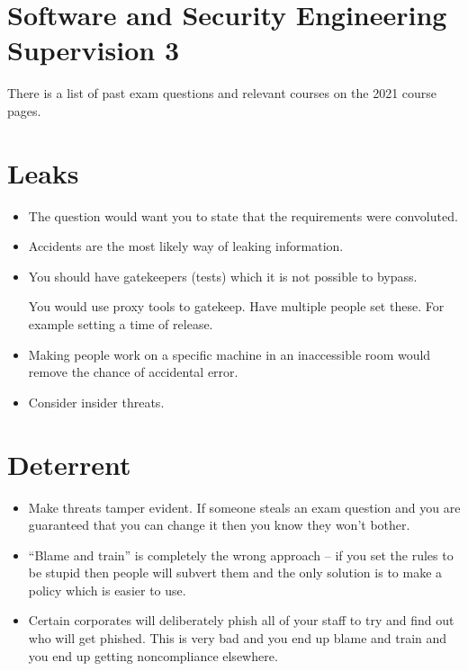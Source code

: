 \documentclass[10pt, a4paper]{article}
\begin{document}
\section*{Software and Security Engineering Supervision 3}

There is a list of past exam questions and relevant courses on the 2021 course pages.

\section{Leaks}

\begin{itemize}

\item The question would want you to state that the requirements were convoluted.

\item Accidents are the most likely way of leaking information.

\item You should have gatekeepers (tests) which it is not possible to bypass.

You would use proxy tools to gatekeep. Have multiple people set these.
For example setting a time of release.

\item Making people work on a specific machine in an inaccessible room would
remove the chance of accidental error.

\item Consider insider threats.

\end{itemize}

\section{Deterrent}

\begin{itemize}

\item Make threats tamper evident. If someone steals an exam question and you are
guaranteed that you can change it then you know they won't bother.

\item ``Blame and train'' is completely the wrong approach -- if you
set the rules to be stupid then people will subvert them and the only
solution is to make a policy which is easier to use.

\item Certain corporates will deliberately phish all of your staff to try and find out
who will get phished. This is very bad and you end up blame and train and you end
up getting noncompliance elsewhere.

\end{itemize}
\end{document}
